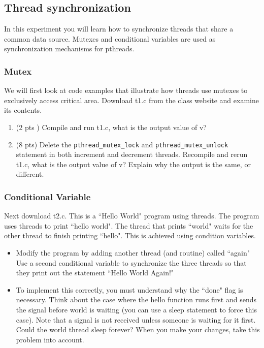 \documentclass[letterpaper,10pt]{article}
\begin{document}
\subsection{Thread synchronization}
In this experiment you will learn how to synchronize threads that share a common
data source. Mutexes and conditional variables are used
as synchronization mechanisms for pthreads.

\subsubsection{Mutex}
We will first look at code examples that illustrate how threads
use mutexes to exclusively access critical area. Download t1.c from
the class website and examine its contents.

\begin{enumerate}
\item (2 pts ) Compile and run t1.c, what is the output value of v?
\item (8 pts) Delete the \verb+pthread_mutex_lock+ and \verb+pthread_mutex_unlock+ statement
in both increment and decrement threads. Recompile and rerun t1.c,
what is the output value of v?
Explain why the output is the same, or different.
\end{enumerate}


\subsubsection{Conditional Variable}
Next download t2.c. This is a ``Hello World" program using threads.
The program uses threads to print ``hello world". The thread that prints
``world" waits for the other thread to finish printing ``hello". This
is achieved using condition variables.

\begin{itemize}
\item Modify the program by adding another thread (and routine)
called ``again" Use a second conditional variable to synchronize
the three threads so that they print out the statement ``Hello World Again!"

\item To implement this correctly, you must understand why the ``done" flag
is necessary. Think about the case where the hello function runs first and
sends the signal before world is waiting (you can use a sleep statement to
force this case). Note that a signal is not received unless someone is waiting
for it first. Could the world thread sleep forever? When you make your
changes, take this problem into account.
\end{itemize}
\end{document}
